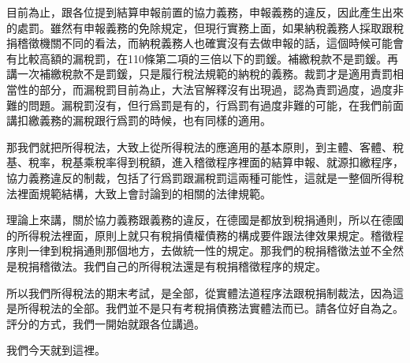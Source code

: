 \documentclass[]{ctexbook}
\begin{document}
目前為止，跟各位提到結算申報前置的協力義務，申報義務的違反，因此產生出來的處罰。雖然有申報義務的免除規定，但現行實務上面，如果納稅義務人採取跟稅捐稽徵機關不同的看法，而納稅義務人也確實沒有去做申報的話，這個時候可能會有比較高額的漏稅罰，在110條第二項的三倍以下的罰鍰。補繳稅款不是罰鍰。再講一次補繳稅款不是罰鍰，只是履行稅法規範的納稅的義務。裁罰才是適用責罰相當性的部分，而漏稅罰目前為止，大法官解釋沒有出現過，認為責罰過度，過度非難的問題。漏稅罰沒有，但行爲罰是有的，行爲罰有過度非難的可能，在我們前面講扣繳義務的漏稅跟行爲罰的時候，也有同樣的適用。

那我們就把所得稅法，大致上從所得稅法的應適用的基本原則，到主體、客體、稅基、稅率，稅基乘稅率得到稅額，進入稽徵程序裡面的結算申報、就源扣繳程序，協力義務違反的制裁，包括了行爲罰跟漏稅罰這兩種可能性，這就是一整個所得稅法裡面規範結構，大致上會討論到的相關的法律規範。

理論上來講，關於協力義務跟義務的違反，在德國是都放到稅捐通則，所以在德國的所得稅法裡面，原則上就只有稅捐債權債務的構成要件跟法律效果規定。稽徵程序則一律到稅捐通則那個地方，去做統一性的規定。那我們的稅捐稽徵法並不全然是稅捐稽徵法。我們自己的所得稅法還是有稅捐稽徵程序的規定。

所以我們所得稅法的期末考試，是全部，從實體法道程序法跟稅捐制裁法，因為這是所得稅法的全部。我們並不是只有考稅捐債務法實體法而已。請各位好自為之。評分的方式，我們一開始就跟各位講過。

我們今天就到這裡。



\backmatter
\printindex
\end{document}
